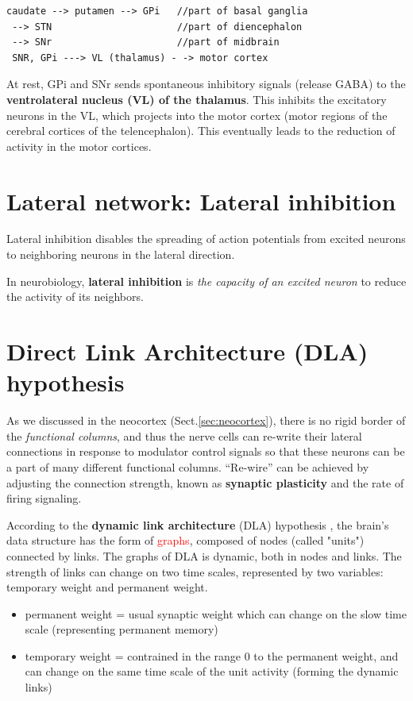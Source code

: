 \begin{verbatim}
caudate --> putamen --> GPi   //part of basal ganglia
 --> STN                      //part of diencephalon
 --> SNr                      //part of midbrain
 SNR, GPi ---> VL (thalamus) - -> motor cortex
\end{verbatim}

At rest, GPi and SNr sends spontaneous inhibitory signals (release GABA) to the
{\bf ventrolateral nucleus (VL) of the thalamus}. This inhibits the excitatory
neurons in the VL, which projects into the motor cortex (motor regions of the cerebral
cortices of the telencephalon). This eventually leads to the reduction of
activity in the motor cortices. 



\section{Lateral network: Lateral inhibition}

Lateral inhibition disables the spreading of action potentials from excited
neurons to neighboring neurons in the lateral direction.

In neurobiology, {\bf lateral inhibition} is {\it the capacity of an excited
neuron} to reduce the activity of its neighbors.



\section{Direct Link Architecture (DLA) hypothesis}
\label{sec:DLA_hypothesis}

As we discussed in the neocortex (Sect.\ref{sec:neocortex}), there is no rigid
border of the {\it functional columns}, and thus the nerve cells can re-write
their lateral connections in response to modulator control signals so that these
neurons can be a part of many different functional columns. ``Re-wire'' can be
achieved by adjusting the connection strength, known as {\bf synaptic
plasticity} and the rate of firing signaling.

According to the {\bf dynamic link architecture} (DLA) hypothesis
\citep{malsburg2003}, the brain's data structure has the form of
\textcolor{red}{graphs}, composed of nodes (called "units") connected by links. The graphs of DLA is dynamic, both in nodes
and links. The strength of links can change on two time scales, represented by
two variables: temporary weight and permanent weight. 
\begin{itemize}
  \item permanent weight = usual synaptic weight which can change on the slow
  time scale (representing permanent memory)
  
  \item temporary weight = contrained in the range 0 to the permanent weight,
  and can change on the same time scale of the unit activity (forming the
  dynamic links)
\end{itemize}


